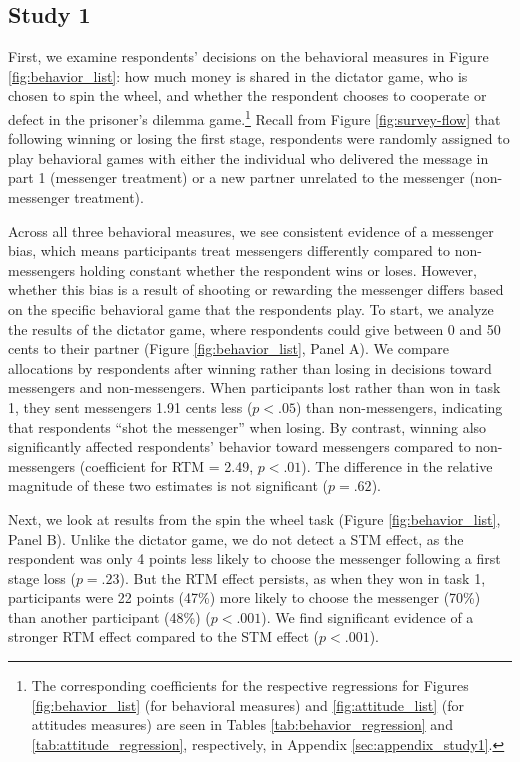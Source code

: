\subsection{Study 1}

First, we examine respondents' decisions on the behavioral measures in Figure \ref{fig:behavior_list}: how
much money is shared in the dictator game, who is chosen to spin the
wheel, and whether the respondent chooses to cooperate or defect in the
prisoner's dilemma game.\footnote{The corresponding coefficients for
  the respective regressions for Figures \ref{fig:behavior_list} (for behavioral measures) and \ref{fig:attitude_list} (for attitudes measures) are seen in Tables \ref{tab:behavior_regression} and \ref{tab:attitude_regression}, respectively, in
  Appendix \ref{sec:appendix_study1}.} Recall from Figure \ref{fig:survey-flow} that following winning or
losing the first stage, respondents were randomly assigned to play
behavioral games with either the individual who delivered the message in
part 1 (messenger treatment) or a new partner unrelated to the messenger
(non-messenger treatment).



Across all three behavioral measures, we see consistent evidence of a
messenger bias, which means participants treat messengers differently
compared to non-messengers holding constant whether the respondent wins or
loses. However, whether this bias is a result of shooting or rewarding
the messenger differs based on the specific behavioral game that the
respondents play. To start, we analyze the results of the dictator game,
where respondents could give between 0 and 50 cents to their partner
(Figure \ref{fig:behavior_list}, Panel A). We compare allocations by respondents after
winning rather than losing in decisions toward messengers and
non-messengers. When participants lost rather than won in task 1, they
sent messengers 1.91 cents less ($p < .05$) than
non-messengers, indicating that respondents ``shot the messenger''
when losing. By contrast, winning also significantly affected respondents'
behavior toward messengers compared to non-messengers (coefficient for
RTM = 2.49, $p < .01$). The difference in the relative
magnitude of these two estimates is not significant ($p =
.62$).

Next, we look at results from the spin the wheel task (Figure \ref{fig:behavior_list}, Panel B). Unlike the dictator game, we do not detect a STM effect, as the
respondent was only 4 points less likely to choose the messenger following
a first stage loss ($p = .23$). But the RTM effect persists, as when
they won in task 1, participants were 22 points (47\%) more likely to
choose the messenger (70\%) than another participant
(48\%) ($p < .001$). We find significant
evidence of a stronger RTM effect compared to the STM effect ($p < .001$).

